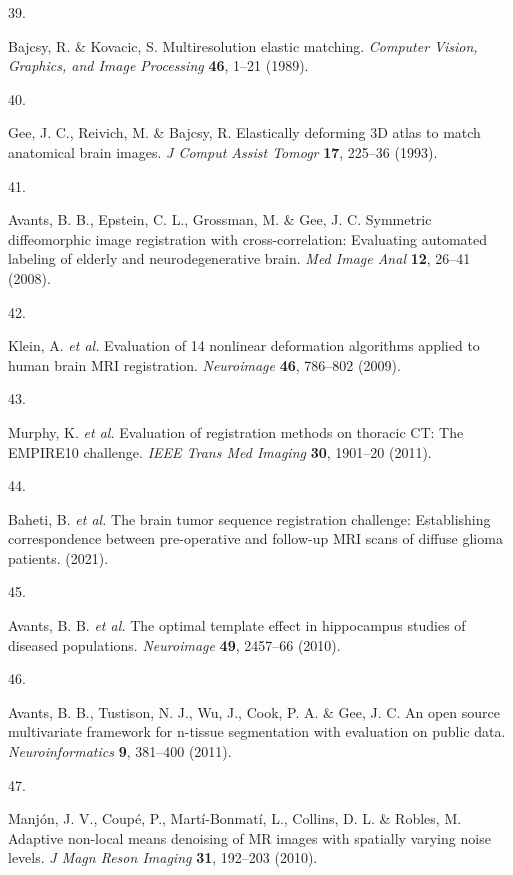 \documentclass[
  12pt,
]{article}
\newlength{\cslhangindent}
\newlength{\csllabelwidth}
\newenvironment{CSLReferences}[2] %
 {%
  \setlength{\parindent}{0pt}
  \ifodd #1 \everypar{\setlength{\hangindent}{\cslhangindent}}\ignorespaces\fi
  \ifnum #2 > 0
  \setlength{\parskip}{#2\baselineskip}
  \fi
 }%
 {}
\newcommand{\CSLLeftMargin}[1]{\parbox[t]{\csllabelwidth}{#1}}
\newcommand{\CSLRightInline}[1]{\parbox[t]{\linewidth - \csllabelwidth}{#1}\break}
\begin{document}
\begin{CSLReferences}{0}{0}
\leavevmode{}%
\CSLLeftMargin{39. }
\CSLRightInline{Bajcsy, R. \& Kovacic, S. Multiresolution elastic
matching. \emph{Computer Vision, Graphics, and Image Processing}
\textbf{46}, 1--21 (1989).}

\leavevmode{}%
\CSLLeftMargin{40. }
\CSLRightInline{Gee, J. C., Reivich, M. \& Bajcsy, R. Elastically
deforming 3D atlas to match anatomical brain images. \emph{J Comput
Assist Tomogr} \textbf{17}, 225--36 (1993).}

\leavevmode{}%
\CSLLeftMargin{41. }
\CSLRightInline{Avants, B. B., Epstein, C. L., Grossman, M. \& Gee, J.
C. Symmetric diffeomorphic image registration with cross-correlation:
Evaluating automated labeling of elderly and neurodegenerative brain.
\emph{Med Image Anal} \textbf{12}, 26--41 (2008).}

\leavevmode{}%
\CSLLeftMargin{42. }
\CSLRightInline{Klein, A. \emph{et al.} Evaluation of 14 nonlinear
deformation algorithms applied to human brain {MRI} registration.
\emph{Neuroimage} \textbf{46}, 786--802 (2009).}

\leavevmode{}%
\CSLLeftMargin{43. }
\CSLRightInline{Murphy, K. \emph{et al.} Evaluation of registration
methods on thoracic {CT}: The {EMPIRE10} challenge. \emph{IEEE Trans Med
Imaging} \textbf{30}, 1901--20 (2011).}

\leavevmode{}%
\CSLLeftMargin{44. }
\CSLRightInline{Baheti, B. \emph{et al.} The brain tumor sequence
registration challenge: Establishing correspondence between
pre-operative and follow-up MRI scans of diffuse glioma patients.
(2021).}

\leavevmode{}%
\CSLLeftMargin{45. }
\CSLRightInline{Avants, B. B. \emph{et al.} The optimal template effect
in hippocampus studies of diseased populations. \emph{Neuroimage}
\textbf{49}, 2457--66 (2010).}

\leavevmode{}%
\CSLLeftMargin{46. }
\CSLRightInline{Avants, B. B., Tustison, N. J., Wu, J., Cook, P. A. \&
Gee, J. C. An open source multivariate framework for n-tissue
segmentation with evaluation on public data. \emph{Neuroinformatics}
\textbf{9}, 381--400 (2011).}

\leavevmode{}%
\CSLLeftMargin{47. }
\CSLRightInline{Manjón, J. V., Coupé, P., Martí-Bonmatí, L., Collins, D.
L. \& Robles, M. Adaptive non-local means denoising of {MR} images with
spatially varying noise levels. \emph{J Magn Reson Imaging} \textbf{31},
192--203 (2010).}


\end{CSLReferences}
\end{document}

